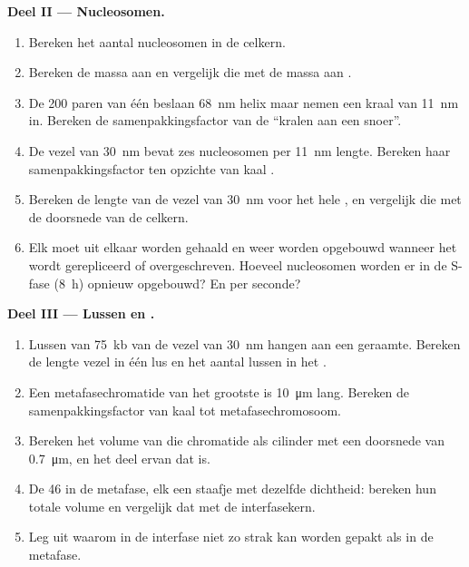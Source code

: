 \begin{problem}
\medskip
\noindent\textbf{Deel II --- Nucleosomen.}
\begin{enumerate}[resume]
  \item Bereken het aantal nucleosomen in de celkern.
  \item Bereken de massa aan  en vergelijk die met de massa aan
        .
  \item De \qty{200}{} paren van één  beslaan \qty{68}{nm} helix
        maar nemen een kraal van \qty{11}{nm} in. Bereken de
        samenpakkingsfactor van de ``kralen aan een snoer''.
  \item De vezel van \qty{30}{nm} bevat zes nucleosomen per \qty{11}{nm}
        lengte. Bereken haar samenpakkingsfactor ten opzichte van kaal .
  \item Bereken de lengte van de vezel van \qty{30}{nm} voor het hele
        , en vergelijk die met de doorsnede van de celkern.
  \item Elk  moet uit elkaar worden gehaald en weer worden
        opgebouwd wanneer het  wordt gerepliceerd of overgeschreven.
        Hoeveel nucleosomen worden er in de S-fase (\qty{8}{h}) opnieuw
        opgebouwd? En per seconde?
\end{enumerate}

\medskip
\noindent\textbf{Deel III --- Lussen en .}
\begin{enumerate}[resume]
  \item Lussen van \qty{75}{kb} van de vezel van \qty{30}{nm} hangen aan
        een geraamte. Bereken de lengte vezel in één lus en het aantal
        lussen in het .
  \item Een metafasechromatide van het grootste  is
        \qty{10}{\micro m} lang. Bereken de samenpakkingsfactor van kaal
         tot metafasechromosoom.
  \item Bereken het volume van die chromatide als cilinder met een
        doorsnede van \qty{0.7}{\micro m}, en het deel ervan dat  is.
  \item De 46  in de metafase, elk een staafje met dezelfde
        dichtheid: bereken hun totale volume en vergelijk dat met de
        interfasekern.
  \item Leg uit waarom  in de interfase niet zo strak kan worden
        gepakt als in de metafase.
\end{enumerate}


\end{problem}
